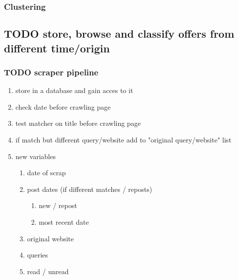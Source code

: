\documentclass[11pt]{article}
\begin{document}
\subsubsection{Clustering}
\label{sec:org5194605}
\subsection{{\bfseries\sffamily TODO} store, browse and classify offers from different time/origin}
\label{sec:org2ec2e3d}
\subsubsection{{\bfseries\sffamily TODO} scraper pipeline}
\label{sec:orga4731d3}
\begin{enumerate}
\item store in a database and gain acces to it
\label{sec:orge7bab27}
\item check date before crawling page
\label{sec:org191a7ee}
\item test matcher on title before crawling page
\label{sec:org09eb02b}
\item if match but different query/website add to "original query/website" list
\label{sec:orgba17a1e}
\item new variables
\label{sec:orge2cb4ac}
\begin{enumerate}
\item date of scrap
\label{sec:orgb2a7b9c}
\item post dates (if different matches / reposts)
\label{sec:org245810f}
\begin{enumerate}
\item new / repost
\label{sec:orgc8183cc}
\item most recent date
\label{sec:orge7a2f2c}
\end{enumerate}
\item original website
\label{sec:org8066a07}
\item queries
\label{sec:orge6201fd}
\item read / unread
\label{sec:orge1a55e5}
\end{enumerate}
\end{enumerate}
\end{document}
